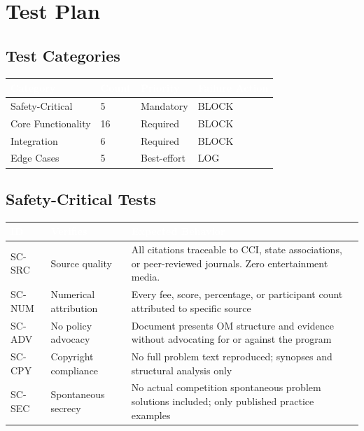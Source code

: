 \documentclass[11pt,letterpaper]{article}
\newcommand{\tableheader}[1]{\textbf{\sffamily\textcolor{white}{#1}}}
\begin{document}
\section{Test Plan}

\subsection{Test Categories}

\begin{center}
\begin{tabularx}{\textwidth}{L{3cm}C{1.5cm}C{1.5cm}C{2cm}}
\toprule
{}
\tableheader{Category} & \tableheader{Count} & \tableheader{Priority} & \tableheader{Failure Action} \\
\midrule
Safety-Critical & 5 & Mandatory & BLOCK \\
Core Functionality & 16 & Required & BLOCK \\
Integration & 6 & Required & BLOCK \\
Edge Cases & 5 & Best-effort & LOG \\
\bottomrule
\end{tabularx}
\end{center}

\subsection{Safety-Critical Tests}

\begin{center}
\begin{tabularx}{\textwidth}{C{1.2cm}L{4cm}X}
\toprule
{}
\tableheader{ID} & \tableheader{Verifies} & \tableheader{Expected Behavior} \\
\midrule
SC-SRC & Source quality & All citations traceable to CCI, state associations, or peer-reviewed journals. Zero entertainment media. \\
SC-NUM & Numerical attribution & Every fee, score, percentage, or participant count attributed to specific source \\
SC-ADV & No policy advocacy & Document presents OM structure and evidence without advocating for or against the program \\
SC-CPY & Copyright compliance & No full problem text reproduced; synopses and structural analysis only \\
SC-SEC & Spontaneous secrecy & No actual competition spontaneous problem solutions included; only published practice examples \\
\bottomrule
\end{tabularx}
\end{center}
\end{document}
